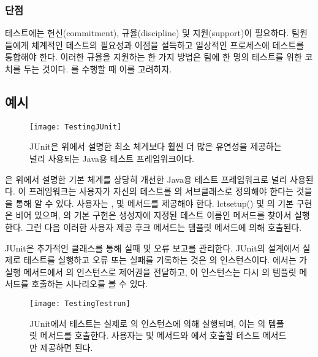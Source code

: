 \documentclass[a4paper,10pt,twoside]{book}
\begin{document}
\subsubsection*{단점}

\begin{bulletlist}
\item  테스트에는 헌신(commitment), 규율(discipline) 및 지원(support)이 필요하다. 팀원들에게 체계적인 테스트의 필요성과 이점을 설득하고 일상적인 프로세스에 테스트를 통합해야 한다. 이러한 규율을 지원하는 한 가지 방법은 팀에 한 명의 테스트를 위한 코치를 두는 것이다. 를 수행할 때 이를 고려하자.
\end{bulletlist}

\subsection*{예시}

\begin{figure}[tb]
\begin{center}
\texttt{[image: TestingJUnit]}
\caption{JUnit은 위에서 설명한 최소 체계보다 훨씬 더 많은 유연성을 제공하는 널리 사용되는 Java용 테스트 프레임워크이다.}
\end{center}
\end{figure}

은 위에서 설명한 기본 체계를 상당히 개선한 Java용 테스트 프레임워크로 널리 사용된다. 이 프레임워크는 사용자가 자신의 테스트를 의 서브클래스로 정의해야 한다는 것을 을 통해 알 수 있다. 사용자는 ,  및  메서드를 제공해야 한다. lct{setup()} 및 의 기본 구현은 비어 있으며, 의 기본 구현은 생성자에 지정된 테스트 이름인 메서드를 찾아서 실행한다. 그런 다음 이러한 사용자 제공 후크 메서드는  템플릿 메서드에 의해 호출된다.

JUnit은 추가적인  클래스를 통해 실패 및 오류 보고를 관리한다. JUnit의 설계에서 실제로 테스트를 실행하고 오류 또는 실패를 기록하는 것은 의 인스턴스이다. 에서는 가 실행 메서드에서 의 인스턴스로 제어권을 전달하고, 이 인스턴스는 다시 의  템플릿 메서드를 호출하는 시나리오를 볼 수 있다.

\begin{figure}[tb]
\begin{center}
\texttt{[image: TestingTestrun]}
\caption{JUnit에서 테스트는 실제로 의 인스턴스에 의해 실행되며, 이는 의  템플릿 메서드를 호출한다. 사용자는  및  메서드와 에서 호출할 테스트 메서드만 제공하면 된다.}
\end{center}
\end{figure}
\end{document}
